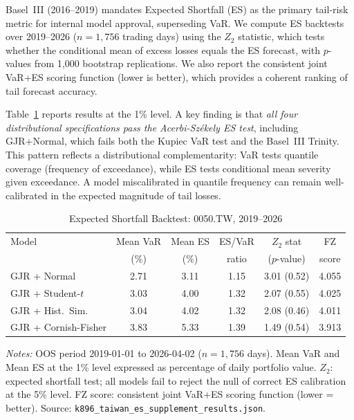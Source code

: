 Basel~III (2016--2019) mandates Expected Shortfall (ES) as the primary tail-risk metric for internal model approval, superseding VaR. We compute ES backtests over 2019--2026 ($n = 1{,}756$ trading days) using the \citet{acerbi2014} $Z_2$ statistic, which tests whether the conditional mean of excess losses equals the ES forecast, with $p$-values from 1,000 bootstrap replications. We also report the \citet{fissler2016} consistent joint VaR+ES scoring function (lower is better), which provides a coherent ranking of tail forecast accuracy.%

Table~\ref{tab:es_backtest} reports results at the 1\% level. A key finding is that \emph{all four distributional specifications pass the Acerbi-Sz\'{e}kely ES test}, including GJR+Normal, which fails both the Kupiec VaR test and the Basel~III Trinity. This pattern reflects a distributional complementarity: VaR tests quantile coverage (frequency of exceedance), while ES tests conditional mean severity given exceedance. A model miscalibrated in quantile frequency can remain well-calibrated in the expected magnitude of tail losses.

\begin{table}[htbp]
\centering
\small
\caption{Expected Shortfall Backtest: 0050.TW, 2019--2026}
\label{tab:es_backtest}
\begin{tabular}{lccccc}
\toprule
Model & Mean VaR & Mean ES & ES/VaR & $Z_2$ stat & FZ \\
      & (\%)     & (\%)    & ratio  & ($p$-value)  & score \\
\midrule
GJR + Normal            & 2.71 & 3.11 & 1.15 & 3.01 (0.52) & 4.055 \\
GJR + Student-$t$       & 3.03 & 4.00 & 1.32 & 2.07 (0.55) & 4.025 \\
GJR + Hist.\ Sim.       & 3.04 & 4.02 & 1.32 & 2.08 (0.46) & 4.011 \\
GJR + Cornish-Fisher    & 3.83 & 5.33 & 1.39 & 1.49 (0.54) & 3.913 \\
\bottomrule
\end{tabular}
\begin{minipage}{\textwidth}
\smallskip
\footnotesize
\textit{Notes:} OOS period 2019-01-01 to 2026-04-02 ($n = 1{,}756$ days). Mean VaR and Mean ES at the 1\% level expressed as percentage of daily portfolio value. $Z_2$: \citet{acerbi2014} expected shortfall test; all models fail to reject the null of correct ES calibration at the 5\% level. FZ score: \citet{fissler2016} consistent joint VaR+ES scoring function (lower = better). Source: \texttt{k896\_taiwan\_es\_supplement\_results.json}.
\end{minipage}
\end{table}


